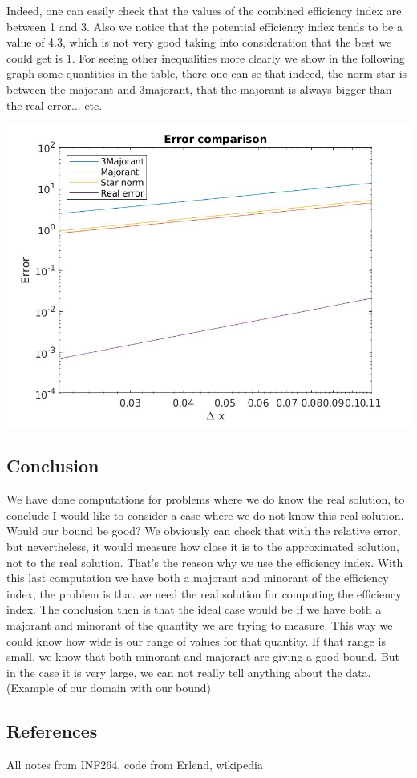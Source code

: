 \documentclass{article}
\begin{document}
    Indeed, one can easily check that the values of the combined efficiency index are between 1 and 3. Also we notice that the potential efficiency index tends to be a value of 4.3, which is not very good taking into consideration that the best we could get is 1. 
    For seeing other inequalities more clearly we show in the following graph some quantities in the table, there one can se that indeed, the norm star is between the majorant and 3majorant, that the majorant is always bigger than the real error... etc.
    \begin{center}
        \includegraphics[width = 0.7\linewidth]{../Images/errorcomparison2d.jpg}
    \end{center}



    \subsection*{Conclusion}
    We have done computations for problems where we do know the real solution, to conclude I would like to consider a case where we do not know this real solution. Would our bound be good? We obviously can check that with the relative error, but nevertheless, it would measure how close it is to the approximated solution, not to the real solution. That's the reason why we use the efficiency index. With this last computation we have both a majorant and minorant of the efficiency index, the problem is that we need the real solution for computing the efficiency index. The conclusion then is that the ideal case would be if we have both a majorant and minorant of the quantity we are trying to measure. This way we could know how wide is our range of values for that quantity. If that range is small, we know that both minorant and majorant are giving a good bound. But in the case it is very large, we can not really tell anything about the data. (Example of our domain with our bound)
    \subsection*{References}
    All notes from INF264, code from Erlend, wikipedia
\end{document}
